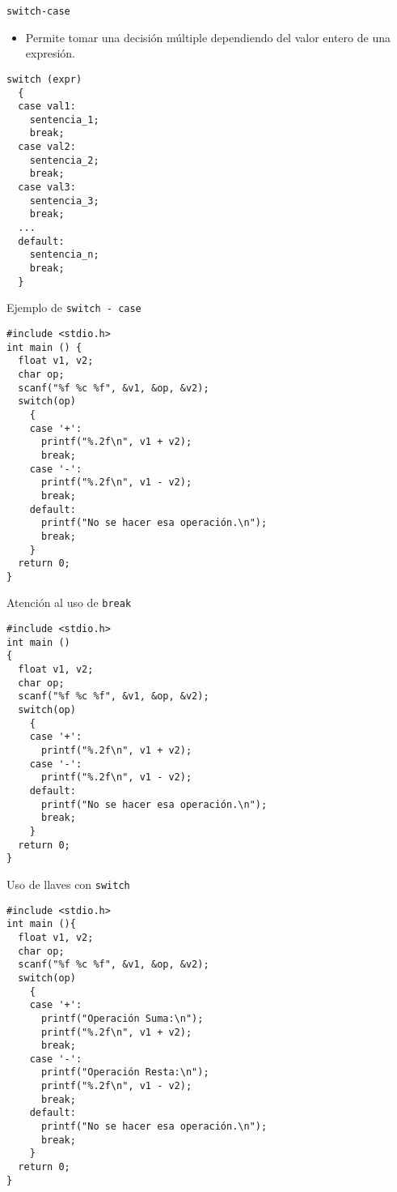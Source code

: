 \documentclass[xcolor={usenames,svgnames,dvipsnames}, aspectratio=169]{beamer}
\begin{document}
\begin{frame}[label={sec:org78b1dff},fragile]{\texttt{switch-case}}
 \begin{itemize}
\item Permite tomar una decisión múltiple dependiendo del valor \alert{entero} de una expresión.
\end{itemize}
\lstset{language=C,label= ,caption= ,captionpos=b,numbers=none}
\begin{lstlisting}
switch (expr)
  {
  case val1:
    sentencia_1;
    break;
  case val2:
    sentencia_2;
    break;
  case val3:
    sentencia_3;
    break;
  ...
  default:
    sentencia_n;
    break;
  }
\end{lstlisting}
\end{frame}
\begin{frame}[label={sec:org943c7ef},fragile,plain]{Ejemplo de \texttt{switch - case}}
 \lstset{language=C,label= ,caption= ,captionpos=b,numbers=none}
\begin{lstlisting}
#include <stdio.h>
int main () {
  float v1, v2;
  char op;
  scanf("%f %c %f", &v1, &op, &v2);
  switch(op)
    {
    case '+':
      printf("%.2f\n", v1 + v2);
      break;
    case '-':
      printf("%.2f\n", v1 - v2);
      break;
    default:
      printf("No se hacer esa operación.\n");
      break;
    }
  return 0; 
}
\end{lstlisting}
\end{frame}

\begin{frame}[label={sec:org3ed1350},fragile]{Atención al uso de \texttt{break}}
 \lstset{language=C,label= ,caption= ,captionpos=b,numbers=none}
\begin{lstlisting}
#include <stdio.h>
int main ()
{
  float v1, v2;
  char op;
  scanf("%f %c %f", &v1, &op, &v2);
  switch(op)
    {
    case '+':
      printf("%.2f\n", v1 + v2);
    case '-':
      printf("%.2f\n", v1 - v2);
    default:
      printf("No se hacer esa operación.\n");
      break;
    }
  return 0;
}
\end{lstlisting}
\end{frame}
\begin{frame}[label={sec:org51ba5eb},fragile,plain]{Uso de llaves con \texttt{switch}}
 \lstset{language=C,label= ,caption= ,captionpos=b,numbers=none,basicstyle=\ttfamily\footnotesize}
\begin{lstlisting}
#include <stdio.h>
int main (){
  float v1, v2;
  char op;
  scanf("%f %c %f", &v1, &op, &v2);
  switch(op)
    {
    case '+':
      printf("Operación Suma:\n");
      printf("%.2f\n", v1 + v2);
      break;
    case '-':
      printf("Operación Resta:\n");
      printf("%.2f\n", v1 - v2);
      break;
    default:
      printf("No se hacer esa operación.\n");
      break;
    }
  return 0;
}
\end{lstlisting}
\end{frame}
\end{document}

